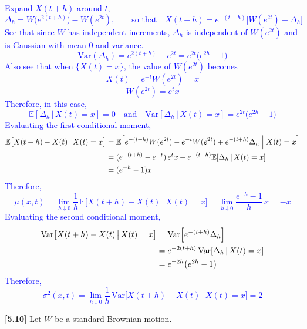 \documentclass{article}
\begin{document}
\begin{enumerate}
    \textcolor{blue}{
Expand $X(t+h)$ around $t$,
$$
\Delta_h=W\!\bigl(e^{2(t+h)}\bigr)-W(e^{2t}),
\qquad\text{so that}\quad
X(t+h)=e^{-(t+h)}\bigl[W(e^{2t})+\Delta_h\bigr]
$$
See that since $W$ has independent increments, $\Delta_h$ is independent of $W(e^{2t})$ and is Gaussian with mean $0$ and variance.  
$$
\mathrm{Var}(\Delta_h)=e^{2(t+h)}-e^{2t}=e^{2t}\bigl(e^{2h}-1\bigr)
$$
Also see that when $\{X(t)=x\}$, the value of $W(e^{2t})$ becomes
$$
X(t)=e^{-t}W(e^{2t})=x
$$
$$
W(e^{2t})=e^{t}x
$$
Therefore, in this case,
$$
\mathbb{E}[\Delta_h\,|\,X(t)=x]=0 \quad \text{and}
\quad
\mathrm{Var}[\Delta_h\,|\,X(t)=x]=e^{2t}\bigl(e^{2h}-1\bigr)
$$
Evaluating the first conditional moment,
\[
\begin{aligned}
\mathbb{E}\bigl[X(t+h)-X(t)\,\big|\,X(t)=x\bigr]
&=\mathbb{E}\Bigl[e^{-(t+h)}W(e^{2t})-e^{-t}W(e^{2t})
                 +e^{-(t+h)}\Delta_h\;\Big|\;X(t)=x\Bigr]\\
&=(e^{-(t+h)}-e^{-t})\,e^{t}x+e^{-(t+h)}\mathbb{E}[\Delta_h\,|\,X(t)=x]\\
&=(e^{-h}-1)x
\end{aligned}
\]
Therefore,
$$
\mu(x,t)
=\lim_{h\downarrow 0}\frac{1}{h}\,\mathbb{E}\bigl[X(t+h)-X(t)\,|\,X(t)=x\bigr]
=\lim_{h\downarrow 0}\frac{e^{-h}-1}{h}\,x
=-x
$$
Evaluating the second conditional moment,
\[
\begin{aligned}
\mathrm{Var}\bigl[X(t+h)-X(t)\,\big|\,X(t)=x\bigr]
&=\mathrm{Var}\Bigl[e^{-(t+h)}\Delta_h\Bigr]\\
&=e^{-2(t+h)}\,\mathrm{Var}[\Delta_h\,|\,X(t)=x]\\
&=e^{-2h}\bigl(e^{2h}-1\bigr)\\
\end{aligned}
\]
Therefore,
$$
\sigma^{2}(x,t)
=\lim_{h\downarrow 0}\frac{1}{h}\,
\mathrm{Var}\bigl[X(t+h)-X(t)\,|\,X(t)=x\bigr]
=2
$$
    }

\end{enumerate}



\textbf{[5.10]} Let $W$ be a standard Brownian motion.
\end{document}
